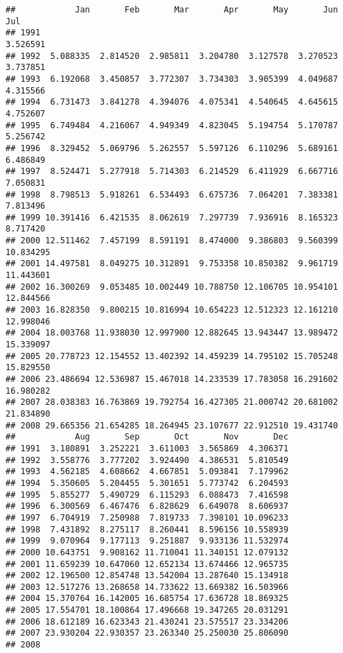 \documentclass[]{book}
\begin{document}
\begin{verbatim}
##            Jan       Feb       Mar       Apr       May       Jun       Jul
## 1991                                                              3.526591
## 1992  5.088335  2.814520  2.985811  3.204780  3.127578  3.270523  3.737851
## 1993  6.192068  3.450857  3.772307  3.734303  3.905399  4.049687  4.315566
## 1994  6.731473  3.841278  4.394076  4.075341  4.540645  4.645615  4.752607
## 1995  6.749484  4.216067  4.949349  4.823045  5.194754  5.170787  5.256742
## 1996  8.329452  5.069796  5.262557  5.597126  6.110296  5.689161  6.486849
## 1997  8.524471  5.277918  5.714303  6.214529  6.411929  6.667716  7.050831
## 1998  8.798513  5.918261  6.534493  6.675736  7.064201  7.383381  7.813496
## 1999 10.391416  6.421535  8.062619  7.297739  7.936916  8.165323  8.717420
## 2000 12.511462  7.457199  8.591191  8.474000  9.386803  9.560399 10.834295
## 2001 14.497581  8.049275 10.312891  9.753358 10.850382  9.961719 11.443601
## 2002 16.300269  9.053485 10.002449 10.788750 12.106705 10.954101 12.844566
## 2003 16.828350  9.800215 10.816994 10.654223 12.512323 12.161210 12.998046
## 2004 18.003768 11.938030 12.997900 12.882645 13.943447 13.989472 15.339097
## 2005 20.778723 12.154552 13.402392 14.459239 14.795102 15.705248 15.829550
## 2006 23.486694 12.536987 15.467018 14.233539 17.783058 16.291602 16.980282
## 2007 28.038383 16.763869 19.792754 16.427305 21.000742 20.681002 21.834890
## 2008 29.665356 21.654285 18.264945 23.107677 22.912510 19.431740          
##            Aug       Sep       Oct       Nov       Dec
## 1991  3.180891  3.252221  3.611003  3.565869  4.306371
## 1992  3.558776  3.777202  3.924490  4.386531  5.810549
## 1993  4.562185  4.608662  4.667851  5.093841  7.179962
## 1994  5.350605  5.204455  5.301651  5.773742  6.204593
## 1995  5.855277  5.490729  6.115293  6.088473  7.416598
## 1996  6.300569  6.467476  6.828629  6.649078  8.606937
## 1997  6.704919  7.250988  7.819733  7.398101 10.096233
## 1998  7.431892  8.275117  8.260441  8.596156 10.558939
## 1999  9.070964  9.177113  9.251887  9.933136 11.532974
## 2000 10.643751  9.908162 11.710041 11.340151 12.079132
## 2001 11.659239 10.647060 12.652134 13.674466 12.965735
## 2002 12.196500 12.854748 13.542004 13.287640 15.134918
## 2003 12.517276 13.268658 14.733622 13.669382 16.503966
## 2004 15.370764 16.142005 16.685754 17.636728 18.869325
## 2005 17.554701 18.100864 17.496668 19.347265 20.031291
## 2006 18.612189 16.623343 21.430241 23.575517 23.334206
## 2007 23.930204 22.930357 23.263340 25.250030 25.806090
## 2008
\end{verbatim}
\end{document}
